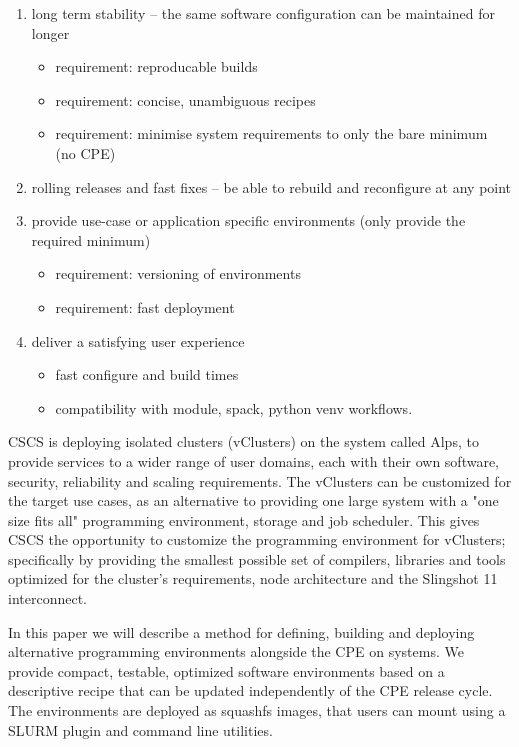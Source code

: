 \begin{enumerate}
    \item long term stability -- the same software configuration can be maintained for longer
    \begin{itemize}
        \item requirement: reproducable builds
        \item requirement: concise, unambiguous recipes
        \item requirement: minimise system requirements to only the bare minimum (no CPE)
    \end{itemize}
    \item rolling releases and fast fixes -- be able to rebuild and reconfigure at any point
    \item provide use-case or application specific environments (only provide the required minimum)
    \begin{itemize}
        \item requirement: versioning of environments
        \item requirement: fast deployment
    \end{itemize}
    \item deliver a satisfying user experience
    \begin{itemize}
        \item fast configure and build times
        \item compatibility with module, spack, python venv workflows.
    \end{itemize}
\end{enumerate}

CSCS is deploying isolated clusters (vClusters) on the \crayex system called Alps, to provide services to a wider range of user domains, each with their own software, security, reliability and scaling requirements.
The vClusters can be customized for the target use cases, as an alternative to providing one large system with a "one size fits all" programming environment, storage and job scheduler.
This gives CSCS the opportunity to customize the programming environment for vClusters; specifically by providing the smallest possible set of compilers, libraries and tools optimized for the cluster's requirements, node architecture and the Slingshot 11 interconnect.

In this paper we will describe a method for defining, building and deploying alternative programming environments alongside the CPE on \crayex systems.
We provide compact, testable, optimized software environments based on a descriptive recipe that can be updated independently of the CPE release cycle.
The environments are deployed as squashfs images, that users can mount using a SLURM plugin and command line utilities.


